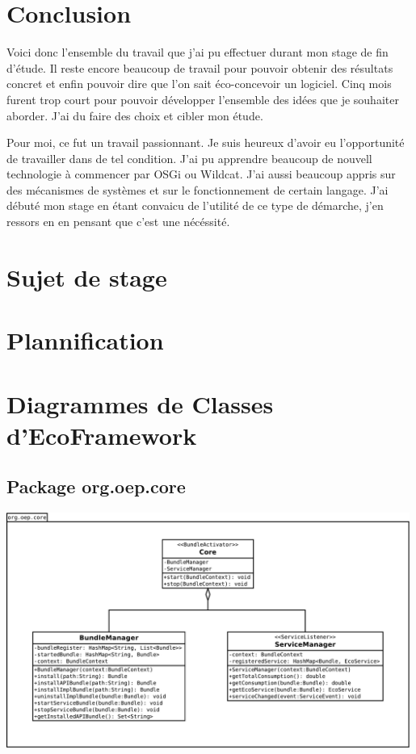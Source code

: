 \documentclass[a4paper, 11pt]{report}
\begin{document}
\chapter{Conclusion}
Voici donc l'ensemble du travail que j'ai pu effectuer durant mon stage de fin d'étude. Il reste encore beaucoup de travail pour pouvoir obtenir des résultats concret et enfin pouvoir dire que l'on sait éco-concevoir un logiciel. Cinq mois furent trop court pour pouvoir développer l'ensemble des idées que je souhaiter aborder. J'ai du faire des choix et cibler mon étude.

Pour moi, ce fut un travail passionnant. Je suis heureux d'avoir eu l'opportunité de travailler dans de tel condition. J'ai pu apprendre beaucoup de nouvell technologie à commencer par OSGi ou Wildcat. J'ai aussi beaucoup appris sur des mécanismes de systèmes et sur le fonctionnement de certain langage. J'ai débuté mon stage en étant convaicu de l'utilité de ce type de démarche, j'en ressors en en pensant que c'est une nécéssité.



\listoffigures{}
\listoftables{}
\appendix

\chapter{Sujet de stage}




\chapter{Plannification}


\chapter{Diagrammes de Classes d'EcoFramework}
\section{Package org.oep.core}
	\begin{centering}
		\includegraphics[width=0.99\textwidth]{figures/EcoPattern_Core_Classes}
	\end{centering}
\end{document}
